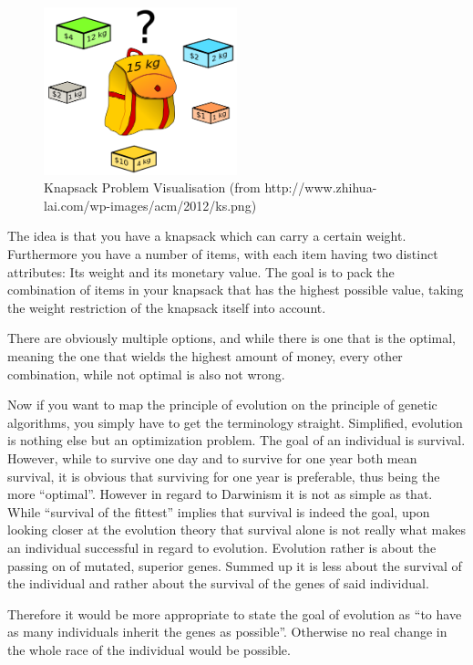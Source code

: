 \documentclass[11pt,a4paper]{article}
\begin{document}
\begin{figure}[h!]
  \centering
  \includegraphics[width=0.5\textwidth]{ks.png}
  \caption{Knapsack Problem Visualisation (from http://www.zhihua-lai.com/wp-images/acm/2012/ks.png)}
\end{figure}

The idea is that you have a knapsack which can carry a certain weight. Furthermore you have a number of items, with each item having two distinct attributes: Its weight and its monetary value. The goal is to pack the combination of items in your knapsack that has the highest possible value, taking the weight restriction of the knapsack itself into account.

There are obviously multiple options, and while there is one that is the optimal, meaning the one that wields the highest amount of money, every other combination, while not optimal is also not wrong.

Now if you want to map the principle of evolution on the principle of genetic algorithms, you simply have to get the terminology straight. Simplified, evolution is nothing else but an optimization problem. The goal of an individual is survival. However, while to survive one day and to survive for one year both mean survival, it is obvious that surviving for one year is preferable, thus being the more “optimal”. However in regard to Darwinism it is not as simple as that. While “survival of the fittest” implies that survival is indeed the goal, upon looking closer at the evolution theory that survival alone is not really what makes an individual successful in regard to evolution. Evolution rather is about the passing on of mutated, superior genes. Summed up it is less about the survival of the individual and rather about the survival of the genes of said individual.

Therefore it would be more appropriate to state the goal of evolution as “to have as many individuals inherit the genes as possible”. Otherwise no real change in the whole race of the individual would be possible.
\end{document}
